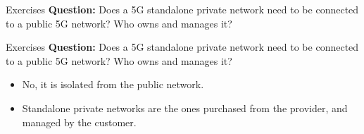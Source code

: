 \documentclass{beamer}
\begin{document}
\begin{frame}{Exercises}
  \textbf{Question:} Does a 5G standalone private network need to be connected to a public 5G network? Who owns and manages it?
\end{frame}

\begin{frame}{Exercises}
  \textbf{Question:} Does a 5G standalone private network need to be connected to a public 5G network? Who owns and manages it?
  \vspace*{0.75em}
  \begin{itemize}
    \item No, it is isolated from the public network. 
    \item Standalone private networks are the ones purchased from the provider, and managed by the customer.
  \end{itemize}
\end{frame}
\end{document}
